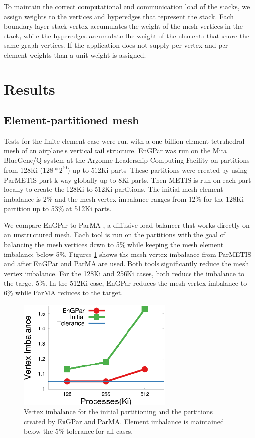 \documentclass[conference]{IEEEtran}
\begin{document}
To maintain the correct computational and communication load of the stacks,
we assign weights to the vertices and hyperedges that represent the stack. Each boundary layer
stack vertex accumulates the weight of the mesh vertices in the stack, while the hyperedges
accumulate the weight of the elements that share the same graph vertices. If the
application does not supply per-vertex and per element weights than a unit
weight is assigned.

\section{Results} \label{sec:results}

\subsection{Element-partitioned mesh}

Tests for the finite element case were run with a one billion element
tetrahedral mesh of an airplane's
vertical tail structure. EnGPar was run on the Mira BlueGene/Q system at the Argonne Leadership
Computing Facility \cite{haring2012ibm} on partitions from 128Ki ($128*2^{10}$) up to 512Ki parts.
These partitions were created by using ParMETIS part k-way \cite{karypis1999parallel} globally
up to 8Ki parts. Then METIS is run on each part locally to create the 128Ki to 512Ki partitions.
The initial mesh element imbalance is 2\% and the mesh vertex imbalance ranges from 12\% for
the 128Ki partition up to 53\% at 512Ki parts.

We compare EnGPar to ParMA \cite{SmithParma2015}, a diffusive load balancer that
works directly on an unstructured mesh.
Each tool is run on the partitions with the goal of balancing the mesh vertices down to 5\%
while keeping the mesh
element imbalance below 5\%. Figures \ref{fig:fem_vtximb} shows the mesh vertex imbalance from
ParMETIS and after EnGPar and ParMA are used. Both tools significantly reduce the mesh vertex
imbalance. For the 128Ki and 256Ki cases, both reduce the imbalance to the target 5\%. In
the 512Ki case, EnGPar reduces the mesh vertex imbalance to 6\% while ParMA reduces to the
target.

\begin{figure}[!ht]
  \centering
  \includegraphics[width=3in]{plots/mira_fem_results/vimb_v_cores}
  \caption{Vertex imbalance for the initial partitioning and the partitions created by
    EnGPar and ParMA. Element imbalance is maintained below the 5\% tolerance for all cases.}
  \label{fig:fem_vtximb}
\end{figure}
\end{document}
